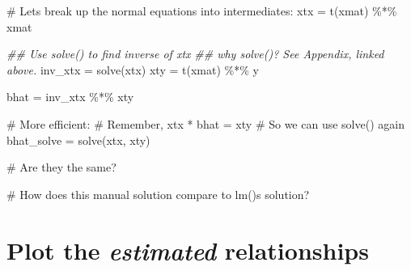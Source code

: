 \documentclass[
  letterpaper,
  DIV=11,
  numbers=noendperiod]{scrreprt}
\newenvironment{Shaded}{\begin{snugshade}}{\end{snugshade}}
\newcommand{\CommentTok}[1]{\textcolor[rgb]{0.37,0.37,0.37}{#1}}
\newcommand{\DocumentationTok}[1]{\textcolor[rgb]{0.37,0.37,0.37}{\textit{#1}}}
\newcommand{\FunctionTok}[1]{\textcolor[rgb]{0.28,0.35,0.67}{#1}}
\newcommand{\NormalTok}[1]{\textcolor[rgb]{0.00,0.23,0.31}{#1}}
\newcommand{\OtherTok}[1]{\textcolor[rgb]{0.00,0.23,0.31}{#1}}
\newcommand{\SpecialCharTok}[1]{\textcolor[rgb]{0.37,0.37,0.37}{#1}}
\begin{document}
\begin{Shaded}
\begin{Highlighting}[]
\CommentTok{\# Let\textquotesingle{}s break up the normal equations into intermediates:}
\NormalTok{xtx }\OtherTok{=} \FunctionTok{t}\NormalTok{(xmat) }\SpecialCharTok{\%*\%}\NormalTok{ xmat}

\DocumentationTok{\#\# Use solve() to find inverse of xtx}
\DocumentationTok{\#\# why solve()? See Appendix, linked above.}
\NormalTok{inv\_xtx }\OtherTok{=} \FunctionTok{solve}\NormalTok{(xtx)}
\NormalTok{xty }\OtherTok{=} \FunctionTok{t}\NormalTok{(xmat) }\SpecialCharTok{\%*\%}\NormalTok{ y}

\NormalTok{bhat }\OtherTok{=}\NormalTok{ inv\_xtx }\SpecialCharTok{\%*\%}\NormalTok{ xty}

\CommentTok{\# More efficient:}
\CommentTok{\# Remember, xtx * bhat = xty}
\CommentTok{\# So we can use solve() again}
\NormalTok{bhat\_solve }\OtherTok{=} \FunctionTok{solve}\NormalTok{(xtx, xty)}

\CommentTok{\# Are they the same?}

\CommentTok{\# How does this manual solution compare to lm()\textquotesingle{}s solution?}
\end{Highlighting}
\end{Shaded}

\hypertarget{sec-est-plot}{%
\section{\texorpdfstring{Plot the \emph{estimated}
relationships}{Plot the estimated relationships}}\label{sec-est-plot}}
\end{document}
